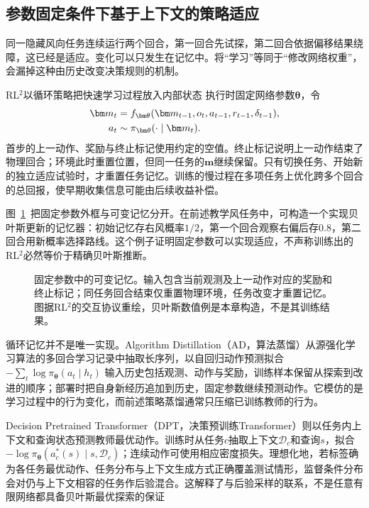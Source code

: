 \subsection{参数固定条件下基于上下文的策略适应}
\label{sec:rl-transfer-context-adaptation}

同一隐藏风向任务连续运行两个回合，第一回合先试探，第二回合依据偏移结果绕障，这已经是适应。变化可以只发生在记忆中。将“学习”等同于“修改网络权重”，会漏掉这种由历史改变决策规则的机制。

RL$^2$以循环策略把快速学习过程放入内部状态
执行时固定网络参数$\bm\theta$，令
\begin{align}
 \bm m_t
 &=f_{\bm\theta}(\bm m_{t-1},o_t,a_{t-1},r_{t-1},\delta_{t-1}),\notag\\
 a_t&\sim\pi_{\bm\theta}(\cdot\mid\bm m_t).
 \label{eq:rl-transfer-rl2}
\end{align}
首步的上一动作、奖励与终止标记使用约定的空值。终止标记说明上一动作结束了物理回合；环境此时重置位置，但同一任务的$\bm m$继续保留。只有切换任务、开始新的独立适应试验时，才重置任务记忆。训练的慢过程在多项任务上优化跨多个回合的总回报，使早期收集信息可能由后续收益补偿。

图~\ref{fig:rl-transfer-rl2-memory}~把固定参数外框与可变记忆分开。在前述教学风任务中，可构造一个实现贝叶斯更新的记忆器：初始记忆存右风概率$1/2$，第一个回合观察右偏后存$0.8$，第二回合用新概率选择路线。这个例子证明固定参数可以实现适应，不声称训练出的RL$^2$必然等价于精确贝叶斯推断。

\begin{figure}[htbp]
 \centering
 
 \caption{固定参数中的可变记忆。输入包含当前观测及上一动作对应的奖励和终止标记；同任务回合结束仅重置物理环境，任务改变才重置记忆。图据RL$^2$的交互协议重绘，贝叶斯数值例是本章构造，不是其训练结果。}
 \label{fig:rl-transfer-rl2-memory}
\end{figure}

循环记忆并不是唯一实现。Algorithm Distillation（AD，算法蒸馏）从源强化学习算法的多回合学习记录中抽取长序列，以自回归动作预测拟合
$-\sum_t\log\pi_{\bm\theta}(a_t\mid h_t)$
输入历史包括观测、动作与奖励，训练样本保留从探索到改进的顺序；部署时把自身新经历追加到历史，固定参数继续预测动作。它模仿的是学习过程中的行为变化，而前述策略蒸馏通常只压缩已训练教师的行为。

Decision Pretrained Transformer（DPT，决策预训练Transformer）则以任务内上下文和查询状态预测教师最优动作。训练时从任务$c$抽取上下文$\mathcal D_c$和查询$s$，拟合
$-\log\pi_{\bm\theta}(a_c^*(s)\mid s,\mathcal D_c)$；连续动作可使用相应密度损失。理想化地，若标签确为各任务最优动作、任务分布与上下文生成方式正确覆盖测试情形，监督条件分布会对仍与上下文相容的任务作后验混合。这解释了与后验采样的联系，不是任意有限网络都具备贝叶斯最优探索的保证


